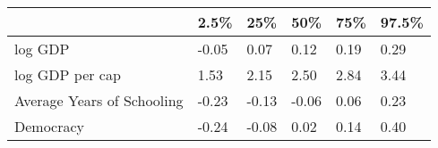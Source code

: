 \begin{tabular}{l|lllll}
                           & 2.5\% & 25\%  & 50\%  & 75\% & 97.5\% \\ \hline
log GDP                    & -0.05 & 0.07  & 0.12  & 0.19 & 0.29   \\
log GDP per cap            & 1.53  & 2.15  & 2.50  & 2.84 & 3.44   \\
Average Years of Schooling & -0.23 & -0.13 & -0.06 & 0.06 & 0.23   \\
Democracy                  & -0.24 & -0.08 & 0.02  & 0.14 & 0.40  
\end{tabular}
